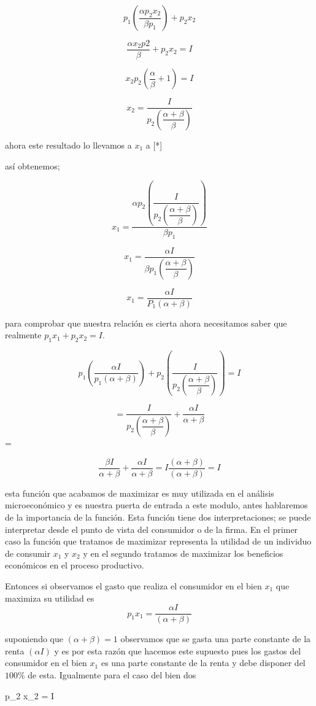 \documentclass[12pt]{article}
\begin{document}
{$$ p_{1} \left( \dfrac{\alpha p_{2} x_{2}}{\beta p_{1}} \right) + p_{2} x_{2} $$

$$ \dfrac{ \alpha x_{2} p{2} }{\beta} + p_{2}x_{2}= I$$

$$x_{2}p_{2}(\dfrac{\alpha}{\beta}+1) = I$$

$$x_{2}=\dfrac{I}{p_{2}  \left(   \dfrac{\alpha + \beta }{\beta} \right)}$$

ahora este resultado lo llevamos a $x_{1}$  a [*]

así obtenemos;

$$ x_{1} = \dfrac{\alpha p_{2} \left( \dfrac {I} {p_{2} \left( \dfrac{\alpha + \beta} {\beta} \right)} \right)} {\beta p_{1}} $$

$$x_{1}= \dfrac{\alpha I }{\beta p_{1} \left( \dfrac{ \alpha + \beta}{\beta} \right) } $$


$$ x_{1} =  \dfrac{\alpha I}{P_{1}(\alpha + \beta)}$$


para comprobar que nuestra relación es cierta ahora necesitamos  saber que realmente $p_{1}x_{1}+p_{2}x_{2}=I$.


$$p_{1} \left( \dfrac{\alpha I}{p_{1} (\alpha + \beta) } \right) + p_{2} \left(  \dfrac{I}{p_{2} \left( \dfrac{\alpha + \beta}{\beta} \right)} \right )= I $$






 $$ = \dfrac{I}{ p_{2} \left( \dfrac{\alpha + \beta}{\beta} \right)} + \dfrac{\alpha I}{\alpha + \beta} $$ = 


$$\dfrac{ \beta I}{\alpha + \beta } + \dfrac{\alpha I}{\alpha + \beta} =I \dfrac{(\alpha + \beta)}{(\alpha + \beta)}= I$$

esta función que acabamos de maximizar es muy utilizada en el análisis microeconómico y es nuestra puerta de entrada a este modulo, antes hablaremos de la importancia de la función. Esta función tiene dos interpretaciones;  se puede interpretar desde el punto de vista del consumidor o de la firma. En el primer caso la función que tratamos de maximizar representa la utilidad de un individuo de  consumir $x_{1}$ y $x_{2}$ y en el segundo tratamos de maximizar los beneficios económicos en el proceso productivo.

Entonces si observamos el gasto que realiza el consumidor en el bien $x_{1}$  que maximiza su utilidad es 
 $$ p_{1} x_{1} =  \dfrac{\alpha I}{(\alpha + \beta)}$$ 
 
  suponiendo que $(\alpha + \beta)=1$ observamos que se gasta una parte constante de la renta  $( \alpha I)$ y es por esta razón que hacemos este supuesto pues los gastos del consumidor en el bien $x_{1}$ es una parte constante de la renta y debe disponer del $100\%$ de esta. Igualmente para el caso del bien dos  
  
  $$p_{2} x_{2} = I\beta}$$
  
\end{document}
